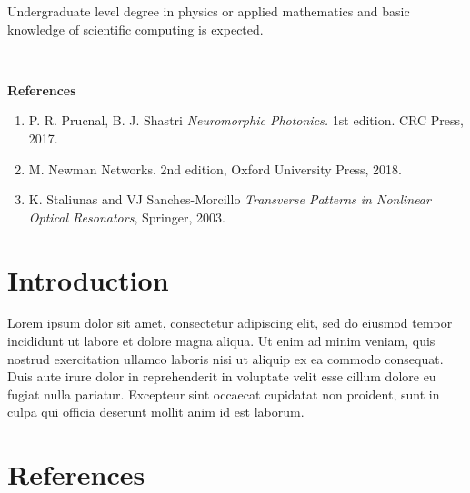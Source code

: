 \documentclass{article}
\begin{document}
\begin{titlepage}
        \noindent Undergraduate level degree in physics or applied mathematics and basic knowledge of scientific computing is expected.

        \ 

        \begin{flushleft}
          \Large \textbf{References}
        \end{flushleft}

        \begin{enumerate}
          \item P. R. Prucnal, B. J. Shastri \textit{Neuromorphic Photonics.} 1st edition. CRC Press, 2017.
          \item M. Newman \textit{}{Networks}. 2nd edition, Oxford University Press, 2018.
          \item K. Staliunas and VJ Sanches-Morcillo \textit{Transverse Patterns in Nonlinear Optical Resonators}, Springer, 2003.

        \end{enumerate}
        
        \vfill
    \end{titlepage}
  
  \section{Introduction}
  
  Lorem ipsum dolor sit amet, consectetur adipiscing elit, sed do eiusmod tempor incididunt ut labore et dolore magna aliqua. Ut enim ad minim veniam, quis nostrud exercitation ullamco laboris nisi ut aliquip ex ea commodo consequat. Duis aute irure dolor in reprehenderit in voluptate velit esse cillum dolore eu fugiat nulla pariatur. Excepteur sint occaecat cupidatat non proident, sunt in culpa qui officia deserunt mollit anim id est laborum. 

  \newpage
  \clearpage
  \section{References}
  \begingroup
    \renewcommand{\section}[2]{}
    
    
  \endgroup

  
\end{document}
